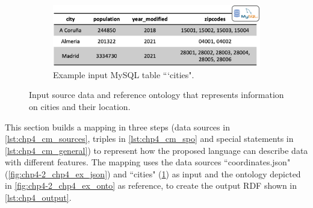 \begin{figure}[t!]
\begin{subfigure}[b]{0.28\linewidth}
    \end{subfigure}
    \begin{subfigure}[b]{0.7\linewidth}
        \centering
    	\includegraphics[width=1\linewidth]{figures/chp4-2_example_rdb}
    	\caption{Example input MySQL table ```cities".}
    	\label{fig:chp4-2_chp4_ex_rdb}
    \end{subfigure}
    \caption[Example data and ontology about cities for CM mapping]{Input source data and reference ontology that represents information on cities and their location.}
    \label{fig:chp4-2_chp4_ex_input}
\end{figure}




This section builds a mapping in three steps (data sources in \cref{lst:chp4_cm_sources}, triples in \cref{lst:chp4_cm_spo} and special statements in \cref{lst:chp4_cm_general}) to represent how the proposed language can describe data with different features. The mapping uses the data sources ``coordinates.json" (\cref{fig:chp4-2_chp4_ex_json}) and ``cities" (\cref{fig:chp4-2_chp4_ex_rdb}) as input and the ontology depicted in  \cref{fig:chp4-2_chp4_ex_onto} as reference, to create the output RDF shown in \cref{lst:chp4_output}. 

